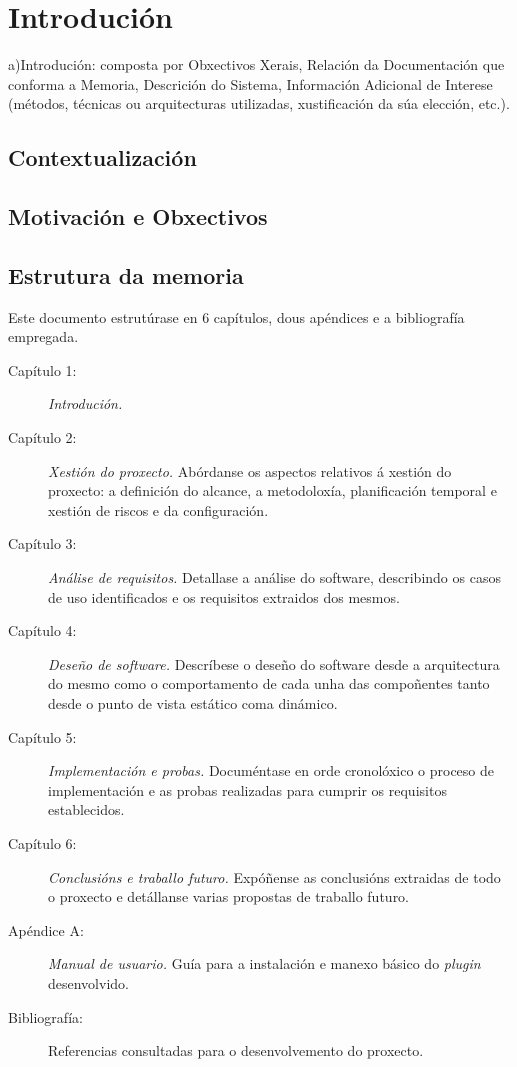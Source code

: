 \chapter{Introdución}
a)Introdución:  composta  por  Obxectivos  Xerais,  Relación  da  Documentación  que  conforma  a 
Memoria,  Descrición  do  Sistema,  Información  Adicional  de  Interese  (métodos,  técnicas  ou 
arquitecturas utilizadas, xustificación da súa elección, etc.). 
 
\section{Contextualización}
\section{Motivación e Obxectivos}
\section{Estrutura da memoria}

Este documento estrutúrase en 6 capítulos, dous apéndices e a bibliografía empregada.

\begin{description}
\item[Capítulo 1:] \textit{Introdución.}
\item[Capítulo 2:] \textit{Xestión do proxecto.} Abórdanse os aspectos relativos á xestión do proxecto: a definición do alcance, a metodoloxía, planificación temporal e xestión de riscos e da configuración.
\item[Capítulo 3:] \textit{Análise de requisitos.} Detallase a análise do software, describindo os casos de uso identificados e os requisitos extraidos dos mesmos.
\item[Capítulo 4:] \textit{Deseño de software.} Descríbese o deseño do software desde a arquitectura do mesmo como o comportamento de cada unha das compoñentes tanto desde o punto de vista estático coma dinámico.
\item[Capítulo 5:] \textit{Implementación e probas.} Documéntase en orde cronolóxico o proceso de implementación e as probas realizadas para cumprir os requisitos establecidos.
\item[Capítulo 6:] \textit{Conclusións e traballo futuro.} Expóñense as conclusións extraidas de todo o proxecto e detállanse varias propostas de traballo futuro.
\item[Apéndice A:] \textit{Manual de usuario.} Guía para a instalación e manexo básico do \emph{plugin} desenvolvido.
\item[Bibliografía:] Referencias consultadas para o desenvolvemento do proxecto.
\end{description}
